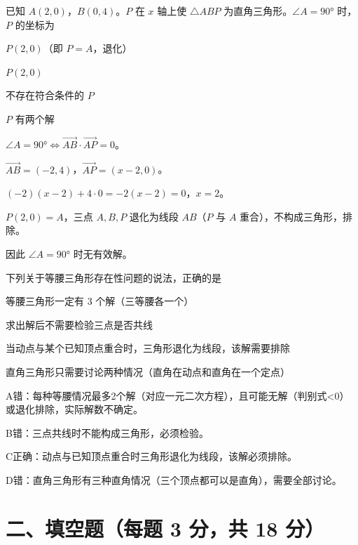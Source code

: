 \documentclass{exam-zh}
\begin{document}
\begin{question}[points=3]
  已知 $A(2,0)$，$B(0,4)$。$P$ 在 $x$ 轴上使 $\triangle ABP$ 为直角三角形。$\angle A=90°$ 时，$P$ 的坐标为
  \begin{choices}
    \item $P(2,0)$（即 $P=A$，退化）
    \item $P(2,0)$
    \item 不存在符合条件的 $P$
    \item $P$ 有两个解
  \end{choices}
  \paren[C]
  \begin{solutionblock}
    $\angle A=90° \Leftrightarrow \overrightarrow{AB}\cdot\overrightarrow{AP}=0$。

$\overrightarrow{AB}=(-2,4)$，$\overrightarrow{AP}=(x-2,0)$。

$(-2)(x-2)+4\cdot 0=-2(x-2)=0$，$x=2$。

$P(2,0)=A$，三点 $A,B,P$ 退化为线段 $AB$（$P$ 与 $A$ 重合），不构成三角形，排除。

因此 $\angle A=90°$ 时无有效解。
  \end{solutionblock}
\end{question}



\begin{question}[points=3]
  下列关于等腰三角形存在性问题的说法，正确的是
  \begin{choices}
    \item 等腰三角形一定有 $3$ 个解（三等腰各一个）
    \item 求出解后不需要检验三点是否共线
    \item 当动点与某个已知顶点重合时，三角形退化为线段，该解需要排除
    \item 直角三角形只需要讨论两种情况（直角在动点和直角在一个定点）
  \end{choices}
  \paren[C]
  \begin{solutionblock}
    A错：每种等腰情况最多2个解（对应一元二次方程），且可能无解（判别式<0）或退化排除，实际解数不确定。

B错：三点共线时不能构成三角形，必须检验。

C正确：动点与已知顶点重合时三角形退化为线段，该解必须排除。

D错：直角三角形有三种直角情况（三个顶点都可以是直角），需要全部讨论。
  \end{solutionblock}
\end{question}


\section*{二、填空题（每题 3 分，共 18 分）}
\end{document}
